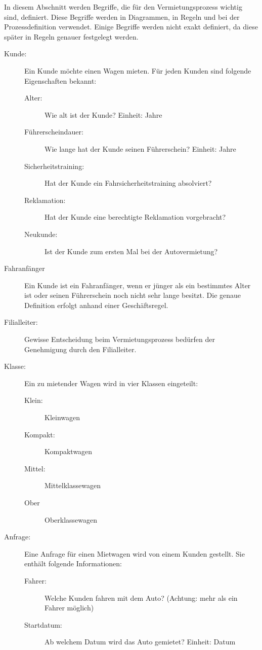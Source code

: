 In diesem Abschnitt werden Begriffe, die für den Vermietungsprozess wichtig sind, definiert.
Diese Begriffe werden in Diagrammen, in Regeln und bei der Prozessdefinition verwendet.
Einige Begriffe werden nicht exakt definiert, da diese später in Regeln genauer
festgelegt werden.

\begin{description}
	\item[Kunde:] Ein Kunde möchte einen Wagen mieten. Für jeden Kunden sind folgende Eigenschaften bekannt:
		\begin{description}
			\item[Alter:] Wie alt ist der Kunde? Einheit: Jahre
			\item[Führerscheindauer:] Wie lange hat der Kunde seinen Führerschein? Einheit: Jahre
			\item[Sicherheitstraining:] Hat der Kunde ein Fahrsicherheitstraining absolviert?
			\item[Reklamation:] Hat der Kunde eine berechtigte Reklamation vorgebracht?
			\item[Neukunde:] Ist der Kunde zum ersten Mal bei der Autovermietung?
		\end{description}
	\item[Fahranfänger] Ein Kunde ist ein Fahranfänger, wenn er jünger als ein bestimmtes Alter ist oder
		seinen Führerschein noch nicht sehr lange besitzt. Die genaue Definition erfolgt anhand einer
		Geschäftsregel.	
	\item[Filialleiter:] Gewisse Entscheidung beim Vermietungsprozess bedürfen der Genehmigung durch
		den Filialleiter.
	\item[Klasse:] Ein zu mietender Wagen wird in vier Klassen eingeteilt:
		\begin{description}
			\item[Klein:] Kleinwagen
			\item[Kompakt:] Kompaktwagen
			\item[Mittel:] Mittelklassewagen
			\item[Ober] Oberklassewagen
		\end{description}
	\item[Anfrage:] Eine Anfrage für einen Mietwagen wird von einem Kunden gestellt. Sie enthält folgende Informationen:
		\begin{description}
			\item[Fahrer:] Welche Kunden fahren mit dem Auto? (Achtung: mehr als ein Fahrer möglich)
			\item[Startdatum:] Ab welchem Datum wird das Auto gemietet? Einheit: Datum

\end{description}
\end{description}
